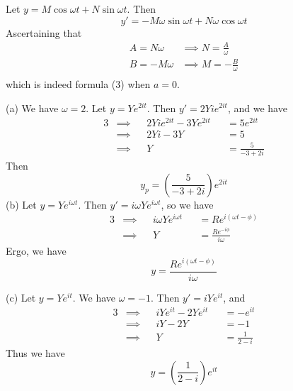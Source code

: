 \documentclass[a4paper]{article}
\begin{document}
Let \(y = M \cos \omega t + N \sin \omega t\). Then
\[
	y' = -M \omega \sin \omega t + N \omega \cos \omega t
\]
Ascertaining that
\begin{align*}
	A = N \omega  & \implies N = \frac{A}{\omega } \\
	B = -M \omega  & \implies M = -\frac{B}{\omega } \\ 
\end{align*}
which is indeed formula (3) when \(a = 0\).


(a) We have \(\omega = 2\). Let \(y = Ye^{2it}\). Then \(y' = 2Yie^{2it}\), and we have
\begin{alignat*}{3}
	&\implies && 2Yie^{2it} - 3Ye^{2it} && = 5e^{2it} \\
	&\implies && 2Yi - 3Y && = 5 \\ 
	&\implies && Y && = \frac{5}{-3 + 2i}
\end{alignat*}
Then
\[
	y_{p} = \!\left( \frac{5}{-3 + 2i} \right) e^{2it}
\]
(b) Let \(y = Ye^{i \omega t}\). Then \(y' = i \omega Ye^{i \omega t}\), so we have
\begin{alignat*}{3}
	&\implies && i \omega Ye^{i \omega t} && = Re^{i \!\left( \omega t - \phi  \right) } \\
	&\implies && Y && = \frac{Re^{-i \phi }}{i \omega }
\end{alignat*}
Ergo, we have
\[
	y = \frac{Re^{i \!\left( \omega t - \phi  \right) }}{i \omega }
\]

(c) Let \(y = Ye^{it }\). We have \(\omega = -1\). Then \(y' = iYe^{it }\), and
\begin{alignat*}{3}
	&\implies && iYe^{it } - 2Ye^{it } && = -e^{it } \\
	&\implies && iY - 2Y && = -1 \\ 
	&\implies && Y && = \frac{1}{2 - i}
\end{alignat*}
Thus we have
\[
	y = \!\left( \frac{1}{2 - i} \right) e^{it}
\]

\end{document}

